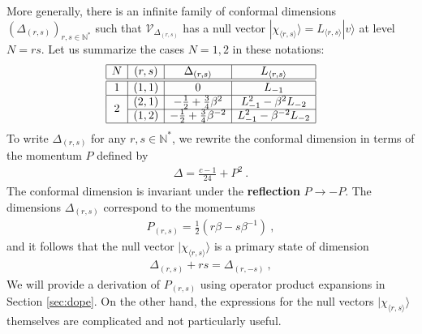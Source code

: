 \documentclass[12pt, a4paper]{article}
\theoremstyle{break}
\begin{document}
More generally, there is an infinite family of conformal dimensions $(\Delta_{(r, s)})_{r,s\in\mathbb{N}^*}$ such that $\mathcal{V}_{\Delta_{(r, s)}}$ has a null vector $|\chi_{\langle r,s\rangle}\rangle = L_{\langle r,s\rangle} |v\rangle$ at level $N=rs$. Let us summarize the cases $N=1,2$ in these notations:
\begin{align}
\begin{array}{|c|c|c|c|}
\hline 
N & (r, s) & \Delta_{(r, s)} &  L_{\langle r,s\rangle} 
\\
\hline\hline
1 & (1, 1) & 0 &  L_{-1}
\\
\hline
\multirow{2}{*}{2} & 
(2, 1) & -\frac12 + \frac34 \beta^{2}  & L_{-1}^2 -\beta^{2} L_{-2}
\\
\cline{2-4}
& (1, 2) & -\frac12 + \frac34 \beta^{-2} & L_{-1}^2 -\beta^{-2} L_{-2} 
\\
\hline
\end{array}
\label{eq:ars}
\end{align}
To write $\Delta_{(r, s)}$ for any $r,s\in\mathbb{N}^*$, we rewrite the conformal dimension in terms of the momentum $P$ defined by 
\begin{align}
 \boxed{\Delta = \frac{c-1}{24} + P^2}\ .
 \label{dp}
\end{align}
The conformal dimension is invariant under the \textbf{reflection} $P\to -P$. The dimensions $\Delta_{(r, s)}$ correspond to the momentums 
\begin{align}
 \boxed{P_{(r, s)} = \frac12\left(r\beta -s\beta^{-1}\right)}\ ,
 \label{prs}
\end{align}
and it follows that the null vector $|\chi_{\langle r,s\rangle}\rangle$ is a primary state of dimension
\begin{align}
 \Delta_{(r, s)} + rs = \Delta_{(r, -s)}\ , 
 \label{drms}
\end{align}
We will provide a derivation of $P_{(r, s)}$ using operator product expansions in Section \ref{sec:dope}. On the other hand, the expressions for the null vectors $|\chi_{\langle r,s\rangle}\rangle$ themselves are complicated and not particularly useful. 
\end{document}
